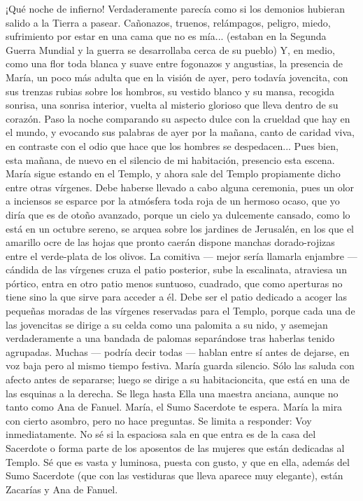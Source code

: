 \documentclass[12pt]{book} %
\begin{document}
¡Qué noche de infierno! Verdaderamente parecía como si los demonios hubieran salido a la Tierra a pasear. Cañonazos, 
truenos, relámpagos, peligro, miedo, sufrimiento por estar en una cama que no es mía... (estaban en la Segunda Guerra Mundial y la guerra se desarrollaba cerca de su pueblo) Y, en medio, como una flor toda blanca y suave entre fogonazos y angustias, la presencia de María, un poco más adulta que en la visión de ayer, pero todavía jovencita, con sus trenzas rubias sobre los hombros, su vestido blanco y su mansa, recogida sonrisa, una sonrisa interior, vuelta al misterio glorioso que lleva dentro de su corazón. Paso la noche comparando su aspecto dulce con la crueldad que hay en el mundo, y evocando sus palabras de ayer por la mañana, canto de caridad viva, en contraste con el odio que hace que los hombres se despedacen... 
Pues bien, esta mañana, de nuevo en el silencio de mi habitación, presencio esta escena. 
María sigue estando en el Templo, y ahora sale del Templo propiamente dicho entre otras vírgenes. 
Debe haberse llevado a cabo alguna ceremonia, pues un olor a inciensos se esparce por la atmósfera toda roja de un hermoso ocaso, que yo diría que es de otoño avanzado, porque un cielo ya dulcemente cansado, como lo está en un octubre sereno, se arquea sobre los jardines de Jerusalén, en los que el amarillo ocre de las hojas que pronto caerán dispone manchas dorado-rojizas entre el verde-plata de los olivos. 
La comitiva — mejor sería llamarla enjambre — cándida de las vírgenes cruza el patio posterior, sube la escalinata, 
atraviesa un pórtico, entra en otro patio menos suntuoso, cuadrado, que como aperturas no tiene sino la que sirve para acceder a él. Debe ser el patio dedicado a acoger las pequeñas moradas de las vírgenes reservadas para el Templo, porque cada una de las jovencitas se dirige a su celda como una palomita a su nido, y asemejan verdaderamente a una bandada de palomas separándose tras haberlas tenido agrupadas. Muchas — podría decir todas — hablan entre sí antes de dejarse, en voz baja pero al mismo tiempo festiva. María guarda silencio. Sólo las saluda con afecto antes de separarse; luego se dirige a su habitacioncita, que está en una de las esquinas a la derecha. 
Se llega hasta Ella una maestra anciana, aunque no tanto como Ana de Fanuel. 
María, el Sumo Sacerdote te espera. 
María la mira con cierto asombro, pero no hace preguntas. Se limita a responder: 
Voy inmediatamente. 
No sé si la espaciosa sala en que entra es de la casa del Sacerdote o forma parte de los aposentos de las mujeres que 
están dedicadas al Templo. Sé que es vasta y luminosa, puesta con gusto, y que en ella, además del Sumo Sacerdote (que con las vestiduras que lleva aparece muy elegante), están Zacarías y Ana de Fanuel. 
\end{document}
